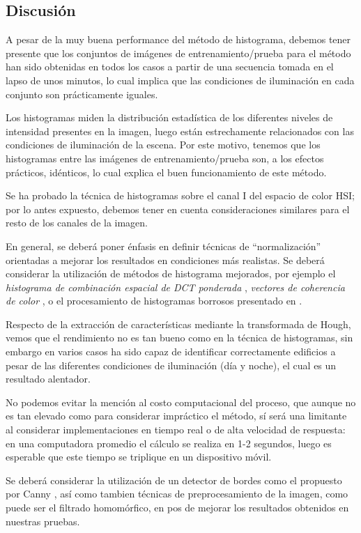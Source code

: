 \documentclass[conference,spanish,a4paper,10pt,oneside,final]{tfmpd}
\begin{document}
\subsection{Discusión}
A pesar de la muy buena performance del método de histograma, debemos tener
presente que los conjuntos de imágenes de entrenamiento/prueba para el método
han sido obtenidas en todos los casos a partir de una secuencia tomada en el 
lapso de unos minutos, lo cual implica que las condiciones de iluminación en
cada conjunto son prácticamente iguales. 

Los histogramas miden la distribución estadística de los diferentes niveles
de intensidad presentes en la imagen, luego están estrechamente relacionados
con las condiciones de iluminación de la escena. Por este motivo, tenemos
que los histogramas entre las imágenes de entrenamiento/prueba son, a los
efectos prácticos, idénticos, lo cual explica el buen funcionamiento de este
método.

Se ha probado la técnica de histogramas sobre el canal I del espacio de color
HSI; por lo antes expuesto, debemos tener en cuenta consideraciones similares
para el resto de los canales de la imagen.

En general, se deberá poner énfasis en definir técnicas
de ``normalización'' orientadas a mejorar los resultados en condiciones más
realistas. Se deberá considerar la utilización de métodos de histograma
mejorados, por ejemplo el \emph{histograma de combinación espacial de DCT
ponderada} \cite{wdctsch}, \emph{vectores de coherencia de
color} \cite{Pass96histogramrefinement}, o el procesamiento de
histogramas borrosos presentado en \cite{Konstantinidis2005375}.

Respecto de la extracción de características mediante la transformada de Hough,
vemos que el rendimiento no es tan bueno como en la técnica de histogramas,
sin embargo en varios casos ha sido capaz de identificar correctamente edificios
a pesar de las diferentes condiciones de iluminación (día y noche), el cual
 es un resultado alentador.

No podemos evitar la mención al costo computacional del proceso, que aunque
no es tan elevado como para considerar impráctico el método, sí será una
limitante al considerar implementaciones en tiempo real o de alta velocidad
de respuesta: en una computadora promedio el cálculo se realiza en 1-2 segundos,
luego es esperable que este tiempo se triplique en un dispositivo móvil.

Se deberá considerar la utilización de un detector de bordes como el propuesto
por Canny \cite{canny}, así como tambien técnicas de preprocesamiento de la
imagen, como puede ser el filtrado homomórfico, en pos de mejorar los
resultados obtenidos en nuestras pruebas.
\end{document}
